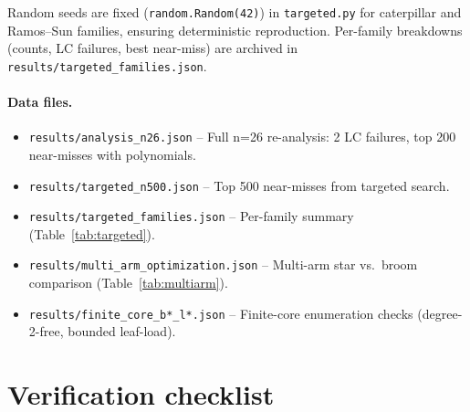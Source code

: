 \documentclass[12pt,oneside]{article}
\theoremstyle{remark}
\begin{document}
Random seeds are fixed (\texttt{random.Random(42)}) in \texttt{targeted.py} for caterpillar and Ramos--Sun families, ensuring deterministic reproduction.
Per-family breakdowns (counts, LC failures, best near-miss) are archived in \texttt{results/targeted\_families.json}.

\paragraph*{Data files.}
\begin{itemize}
  \item \texttt{results/analysis\_n26.json} -- Full n=26 re-analysis: 2 LC failures, top 200 near-misses with polynomials.
  \item \texttt{results/targeted\_n500.json} -- Top 500 near-misses from targeted search.
  \item \texttt{results/targeted\_families.json} -- Per-family summary (Table~\ref{tab:targeted}).
  \item \texttt{results/multi\_arm\_optimization.json} -- Multi-arm star vs.\ broom comparison (Table~\ref{tab:multiarm}).
  \item \texttt{results/finite\_core\_b*\_l*.json} -- Finite-core enumeration checks (degree-2-free, bounded leaf-load).
\end{itemize}


\section{Verification checklist}\label{app:verify}
\end{document}
